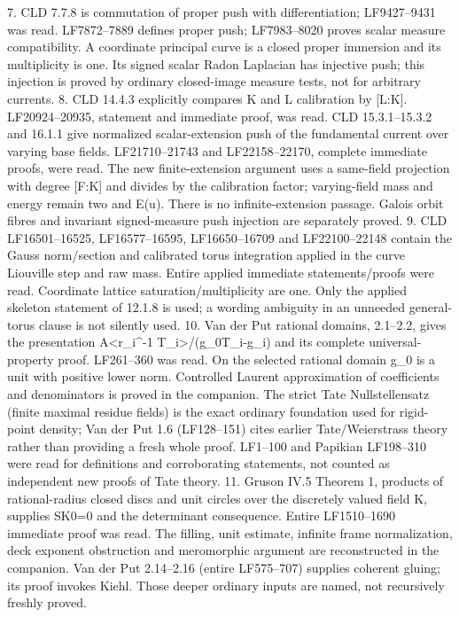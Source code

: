 \documentclass[11pt]{article}
\begin{document}
7. CLD 7.7.8 is commutation of proper push with differentiation; LF9427--9431 was read. LF7872--7889 defines proper push; LF7983--8020 proves scalar measure compatibility. A coordinate principal curve is a closed proper immersion and its multiplicity is one. Its signed scalar Radon Laplacian has injective push; this injection is proved by ordinary closed-image measure tests, not for arbitrary currents.
8. CLD 14.4.3 explicitly compares K and L calibration by [L:K]. LF20924--20935, statement and immediate proof, was read. CLD 15.3.1--15.3.2 and 16.1.1 give normalized scalar-extension push of the fundamental current over varying base fields. LF21710--21743 and LF22158--22170, complete immediate proofs, were read. The new finite-extension argument uses a same-field projection with degree [F:K] and divides by the calibration factor; varying-field mass and energy remain two and E(u). There is no infinite-extension passage. Galois orbit fibres and invariant signed-measure push injection are separately proved.
9. CLD LF16501--16525, LF16577--16595, LF16650--16709 and LF22100--22148 contain the Gauss norm/section and calibrated torus integration applied in the curve Liouville step and raw mass. Entire applied immediate statements/proofs were read. Coordinate lattice saturation/multiplicity are one. Only the applied skeleton statement of 12.1.8 is used; a wording ambiguity in an unneeded general-torus clause is not silently used.
10. Van der Put rational domains, 2.1--2.2, gives the presentation A<r\_i\textasciicircum{}-1 T\_i>/(g\_0T\_i-g\_i) and its complete universal-property proof. LF261--360 was read. On the selected rational domain g\_0 is a unit with positive lower norm. Controlled Laurent approximation of coefficients and denominators is proved in the companion. The strict Tate Nullstellensatz (finite maximal residue fields) is the exact ordinary foundation used for rigid-point density; Van der Put 1.6 (LF128--151) cites earlier Tate/Weierstrass theory rather than providing a fresh whole proof. LF1--100 and Papikian LF198--310 were read for definitions and corroborating statements, not counted as independent new proofs of Tate theory.
11. Gruson IV.5 Theorem 1, products of rational-radius closed discs and unit circles over the discretely valued field K, supplies SK0=0 and the determinant consequence. Entire LF1510--1690 immediate proof was read. The filling, unit estimate, infinite frame normalization, deck exponent obstruction and meromorphic argument are reconstructed in the companion. Van der Put 2.14--2.16 (entire LF575--707) supplies coherent gluing; its proof invokes Kiehl. Those deeper ordinary inputs are named, not recursively freshly proved.
\end{document}
